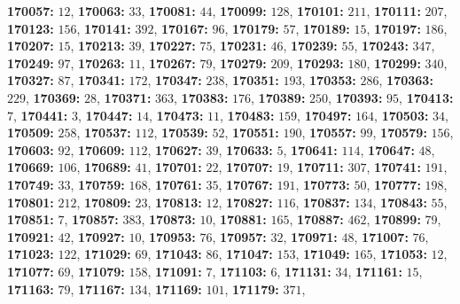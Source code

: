\textsf{\bfseries 170057:} $12$, \textsf{\bfseries 170063:} $33$, \textsf{\bfseries 170081:} $44$, \textsf{\bfseries 170099:} $128$, \textsf{\bfseries 170101:} $211$, \textsf{\bfseries 170111:} $207$, \textsf{\bfseries 170123:} $156$, \textsf{\bfseries 170141:} $392$, \textsf{\bfseries 170167:} $96$, \textsf{\bfseries 170179:} $57$, \textsf{\bfseries 170189:} $15$, \textsf{\bfseries 170197:} $186$, \textsf{\bfseries 170207:} $15$, \textsf{\bfseries 170213:} $39$, \textsf{\bfseries 170227:} $75$, \textsf{\bfseries 170231:} $46$, \textsf{\bfseries 170239:} $55$, \textsf{\bfseries 170243:} $347$, \textsf{\bfseries 170249:} $97$, \textsf{\bfseries 170263:} $11$, \textsf{\bfseries 170267:} $79$, \textsf{\bfseries 170279:} $209$, \textsf{\bfseries 170293:} $180$, \textsf{\bfseries 170299:} $340$, \textsf{\bfseries 170327:} $87$, \textsf{\bfseries 170341:} $172$, \textsf{\bfseries 170347:} $238$, \textsf{\bfseries 170351:} $193$, \textsf{\bfseries 170353:} $286$, \textsf{\bfseries 170363:} $229$, \textsf{\bfseries 170369:} $28$, \textsf{\bfseries 170371:} $363$, \textsf{\bfseries 170383:} $176$, \textsf{\bfseries 170389:} $250$, \textsf{\bfseries 170393:} $95$, \textsf{\bfseries 170413:} $7$, \textsf{\bfseries 170441:} $3$, \textsf{\bfseries 170447:} $14$, \textsf{\bfseries 170473:} $11$, \textsf{\bfseries 170483:} $159$, \textsf{\bfseries 170497:} $164$, \textsf{\bfseries 170503:} $34$, \textsf{\bfseries 170509:} $258$, \textsf{\bfseries 170537:} $112$, \textsf{\bfseries 170539:} $52$, \textsf{\bfseries 170551:} $190$, \textsf{\bfseries 170557:} $99$, \textsf{\bfseries 170579:} $156$, \textsf{\bfseries 170603:} $92$, \textsf{\bfseries 170609:} $112$, \textsf{\bfseries 170627:} $39$, \textsf{\bfseries 170633:} $5$, \textsf{\bfseries 170641:} $114$, \textsf{\bfseries 170647:} $48$, \textsf{\bfseries 170669:} $106$, \textsf{\bfseries 170689:} $41$, \textsf{\bfseries 170701:} $22$, \textsf{\bfseries 170707:} $19$, \textsf{\bfseries 170711:} $307$, \textsf{\bfseries 170741:} $191$, \textsf{\bfseries 170749:} $33$, \textsf{\bfseries 170759:} $168$, \textsf{\bfseries 170761:} $35$, \textsf{\bfseries 170767:} $191$, \textsf{\bfseries 170773:} $50$, \textsf{\bfseries 170777:} $198$, \textsf{\bfseries 170801:} $212$, \textsf{\bfseries 170809:} $23$, \textsf{\bfseries 170813:} $12$, \textsf{\bfseries 170827:} $116$, \textsf{\bfseries 170837:} $134$, \textsf{\bfseries 170843:} $55$, \textsf{\bfseries 170851:} $7$, \textsf{\bfseries 170857:} $383$, \textsf{\bfseries 170873:} $10$, \textsf{\bfseries 170881:} $165$, \textsf{\bfseries 170887:} $462$, \textsf{\bfseries 170899:} $79$, \textsf{\bfseries 170921:} $42$, \textsf{\bfseries 170927:} $10$, \textsf{\bfseries 170953:} $76$, \textsf{\bfseries 170957:} $32$, \textsf{\bfseries 170971:} $48$, \textsf{\bfseries 171007:} $76$, \textsf{\bfseries 171023:} $122$, \textsf{\bfseries 171029:} $69$, \textsf{\bfseries 171043:} $86$, \textsf{\bfseries 171047:} $153$, \textsf{\bfseries 171049:} $165$, \textsf{\bfseries 171053:} $12$, \textsf{\bfseries 171077:} $69$, \textsf{\bfseries 171079:} $158$, \textsf{\bfseries 171091:} $7$, \textsf{\bfseries 171103:} $6$, \textsf{\bfseries 171131:} $34$, \textsf{\bfseries 171161:} $15$, \textsf{\bfseries 171163:} $79$, \textsf{\bfseries 171167:} $134$, \textsf{\bfseries 171169:} $101$, \textsf{\bfseries 171179:} $371$, 
